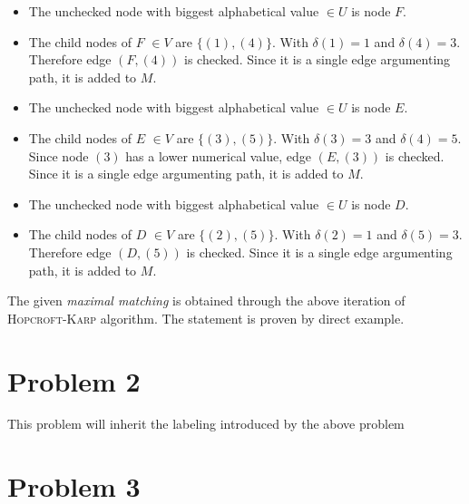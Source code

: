 \documentclass[11pt]{article}
\begin{document}
\begin{itemize}
    \item The unchecked node with biggest alphabetical value $\in U$ is node $F$.
    \item The child nodes of $F$ $\in V$ are $\{(1), (4)\}$. With $\delta{(1)} = 1$ and $\delta{(4)} = 3$. Therefore edge $(F, (4))$ is checked. Since it is a single edge argumenting path, it is added to $M$.
    \item The unchecked node with biggest alphabetical value $\in U$ is node $E$.
    \item The child nodes of $E$ $\in V$ are $\{(3), (5)\}$. With $\delta{(3)} = 3$ and $\delta{(4)} = 5$. Since node $(3)$ has a lower numerical value, edge $(E, (3))$ is checked. Since it is a single edge argumenting path, it is added to $M$.
    \item The unchecked node with biggest alphabetical value $\in U$ is node $D$.
    \item The child nodes of $D$ $\in V$ are $\{(2), (5)\}$. With $\delta{(2)} = 1$ and $\delta{(5)} = 3$. Therefore edge $(D, (5))$ is checked. Since it is a single edge argumenting path, it is added to $M$.
\end{itemize}

The given \textit{maximal matching} is obtained through the above iteration of \textsc{Hopcroft-Karp} algorithm. The statement is proven by direct example.

\section{Problem 2}

This problem will inherit the labeling introduced by the above problem

\section{Problem 3}


%
% 
% 
\end{document}
